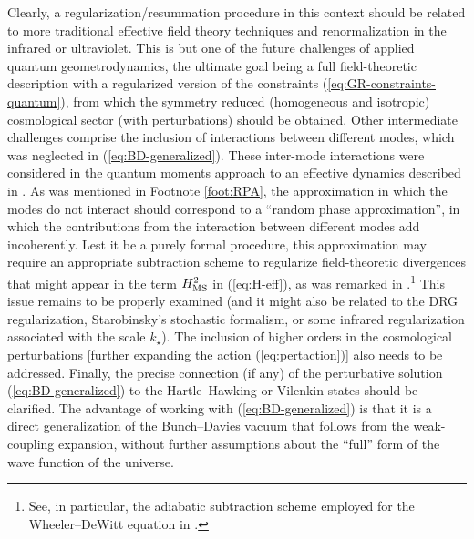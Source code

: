 \documentclass[12pt]{iopart}
\def\eref#1{(\ref{eq:#1})}
\begin{document}
Clearly, a regularization/resummation procedure in this context should be related to more traditional effective field theory techniques and renormalization in the infrared or ultraviolet. This is but one of the future challenges of applied quantum geometrodynamics, the ultimate goal being a full field-theoretic description with a regularized version of the constraints \eref{GR-constraints-quantum}, from which the symmetry reduced (homogeneous and isotropic) cosmological sector (with perturbations) should be obtained. Other intermediate challenges comprise the inclusion of interactions between different modes, which was neglected in \eref{BD-generalized}. These inter-mode interactions were considered in the quantum moments approach to an effective dynamics described in \citet{Brizuela:mode-coupling}. As was mentioned in Footnote \ref{foot:RPA}, the approximation in which the modes do not interact should correspond to a ``random phase approximation'', in which the contributions from the interaction between different modes add incoherently. Lest it be a purely formal procedure, 
this approximation may require an appropriate subtraction scheme to regularize field-theoretic divergences that might appear in the term $H_{\rm MS}^2$ in \eref{H-eff}, as was remarked in \citet{Chataignier:2020fap}.\footnote{See, in particular, the adiabatic subtraction scheme employed for the Wheeler--DeWitt equation in \citet{Mazzitelli:1991rf}.} This issue remains to be properly examined (and it might also be related to the DRG regularization, Starobinsky's stochastic formalism, or some infrared regularization associated with the scale $k_{\star}$). The inclusion of higher orders in the cosmological perturbations [further expanding the action \eref{pertaction}] also needs to be addressed. Finally, the precise connection (if any) of the perturbative solution \eref{BD-generalized} to the Hartle--Hawking or Vilenkin states should be clarified. The advantage of working with \eref{BD-generalized} is that it is a direct generalization of the Bunch--Davies vacuum that follows from the weak-coupling expansion, without further assumptions about the ``full'' form of the wave function of the universe.
\end{document}
